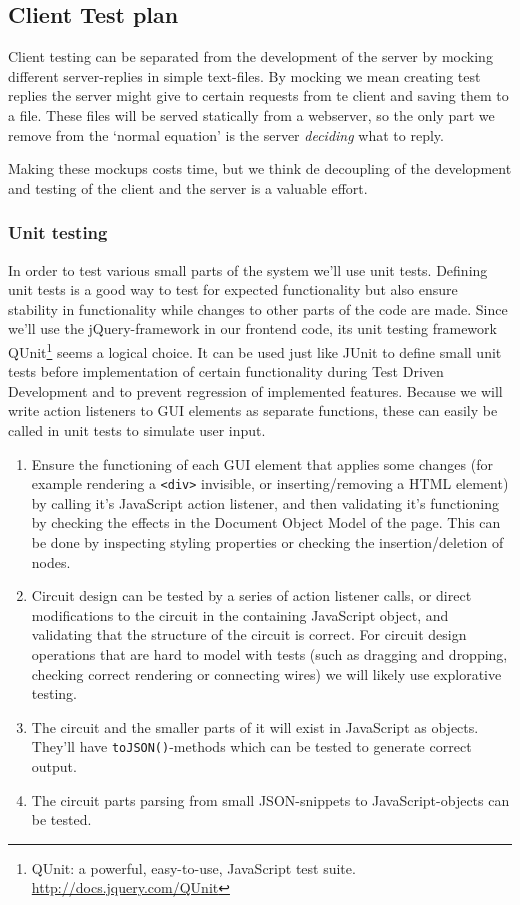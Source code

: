 \subsection{Client Test plan}
Client testing can be separated from the development of the server by mocking different server-replies in simple text-files. By mocking we mean creating test replies the server might give to certain requests from te client and saving them to a file. These files will be served statically from a webserver, so the only part we remove from the `normal equation' is the server \textit{deciding} what to reply.

Making these mockups costs time, but we think de decoupling of the development and testing of the client and the server is a valuable effort.

\subsubsection{Unit testing}
In order to test various small parts of the system we'll use unit tests. Defining unit tests is a good way to test for expected functionality but also ensure stability in functionality while changes to other parts of the code are made. Since we'll use the jQuery-framework in our frontend code, its unit testing framework QUnit\footnote{QUnit: a powerful, easy-to-use, JavaScript test suite. \url{http://docs.jquery.com/QUnit}} seems a logical choice. It can be used just like JUnit to define small unit tests before implementation of certain functionality during Test Driven Development and to prevent regression of implemented features. Because we will write action listeners to GUI elements as separate functions, these can easily be called in unit tests to simulate user input.
\begin{enumerate}
\item Ensure the functioning of each GUI element that applies some changes (for example rendering a \verb-<div>- invisible, or inserting/removing a HTML element) by calling it's JavaScript action listener, and then validating it's functioning by checking the effects in the Document Object Model of the page. This can be done by inspecting styling properties or checking the insertion/deletion of nodes.
\item Circuit design can be tested by a series of action listener calls, or direct modifications to the circuit in the containing JavaScript object, and validating that the structure of the circuit is correct.
For circuit design operations that are hard to model with tests (such as dragging and dropping, checking correct rendering or connecting wires) we will likely use explorative testing.
\item The circuit and the smaller parts of it will exist in JavaScript as objects. They'll have \verb|toJSON()|-methods which can be tested to generate correct output.
\item The circuit parts parsing from small JSON-snippets to JavaScript-objects can be tested. 
\end{enumerate}

